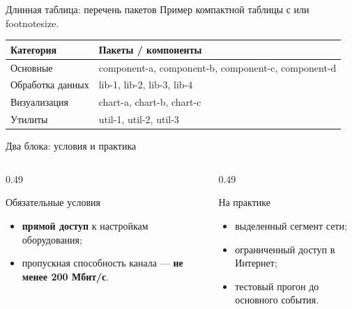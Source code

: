 \begin{frame}{Длинная таблица: перечень пакетов\orient}
  \vspace{0.2em}
  {\footnotesize\color{acGray}Пример компактной таблицы с {\ttfamily\small} или
  {\ttfamily footnotesize}.}
  \vspace{0.5em}

  \footnotesize
  \begin{tabular}{@{}p{}p{}@{}}
    \toprule
    \textbf{Категория} & \textbf{Пакеты / компоненты}\\
    \midrule
    Основные &
      \ttfamily component-a, component-b, component-c, component-d \\
    \addlinespace[0.3em]
    Обработка данных &
      \ttfamily lib-1, lib-2, lib-3, lib-4 \\
    \addlinespace[0.3em]
    Визуализация &
      \ttfamily chart-a, chart-b, chart-c \\
    \addlinespace[0.3em]
    Утилиты &
      \ttfamily util-1, util-2, util-3 \\
    \bottomrule
  \end{tabular}
\end{frame}

\begin{frame}{Два блока: условия и практика}
  \vspace{0.3em}
  \begin{columns}[T]
    \begin{column}{0.49\textwidth}
      \begin{block}{Обязательные условия}
        \begin{itemize}\setlength\itemsep{0.3em}
          \item \textbf{прямой доступ} к настройкам оборудования;
          \item пропускная способность канала --- \textbf{не менее 200 Мбит/с}.
        \end{itemize}
      \end{block}
    \end{column}
    \begin{column}{0.49\textwidth}
      \begin{block}{На практике}
        \begin{itemize}\setlength\itemsep{0.3em}
          \item выделенный сегмент сети;
          \item ограниченный доступ в Интернет;
          \item тестовый прогон до основного события.
        \end{itemize}
      \end{block}
    \end{column}
  \end{columns}
\end{frame}
